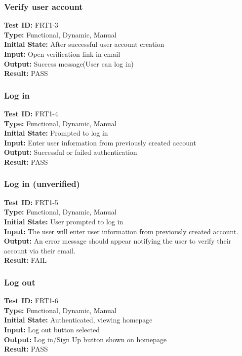 \documentclass[12pt,fleqn]{article}
\begin{document}
\subsubsection{Verify user account}
\textbf{Test ID:} FRT1-3\\
\textbf{Type:} Functional, Dynamic, Manual\\
\textbf{Initial State:} After successful user account creation\\
\textbf{Input:} Open verification link in email \\
\textbf{Output:} Success message(User can log in) \\
\textbf{Result:} PASS

\subsubsection{Log in}
\textbf{Test ID:} FRT1-4\\
\textbf{Type:} Functional, Dynamic, Manual\\
\textbf{Initial State:} Prompted to log in\\
\textbf{Input:} Enter user information from previously created account\\
\textbf{Output:} Successful or failed authentication\\
\textbf{Result:} PASS

\subsubsection{Log in (unverified)}
\textbf{Test ID:} FRT1-5\\
\textbf{Type:} Functional, Dynamic, Manual\\
\textbf{Initial State:} User prompted to log in\\
\textbf{Input:} The user will enter user information from previously created account.\\
\textbf{Output:} An error message should appear notifying the user to verify their account via their email.\\
\textbf{Result:} FAIL

\subsubsection{Log out}
\textbf{Test ID:} FRT1-6\\
\textbf{Type:} Functional, Dynamic, Manual\\
\textbf{Initial State:} Authenticated, viewing homepage\\
\textbf{Input:} Log out button selected\\
\textbf{Output:} Log in/Sign Up button shown on homepage\\
\textbf{Result:} PASS
\end{document}
